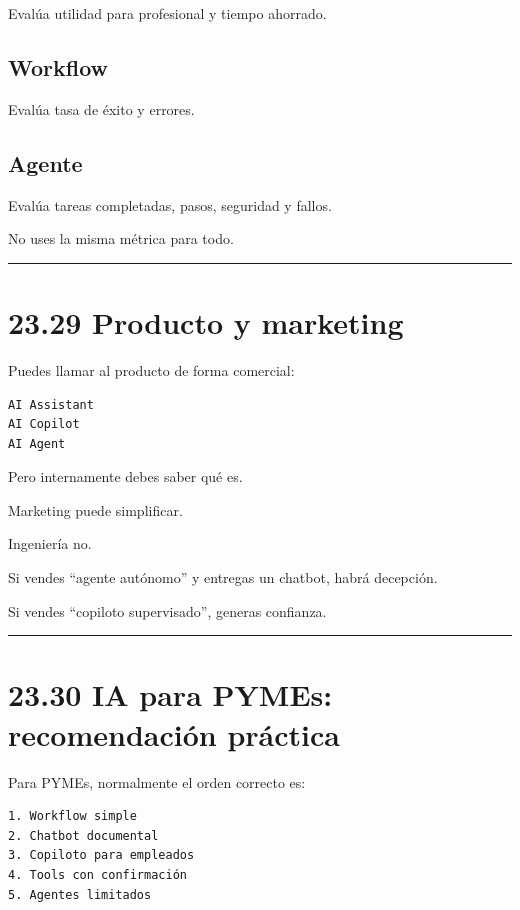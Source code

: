 Evalúa utilidad para profesional y tiempo ahorrado.

\subsection{Workflow}\label{workflow-4}

Evalúa tasa de éxito y errores.

\subsection{Agente}\label{agente-5}

Evalúa tareas completadas, pasos, seguridad y fallos.

No uses la misma métrica para todo.

\begin{center}\rule{0.5\linewidth}{0.5pt}\end{center}

\section{23.29 Producto y marketing}\label{producto-y-marketing}

Puedes llamar al producto de forma comercial:

\begin{lstlisting}
AI Assistant
AI Copilot
AI Agent
\end{lstlisting}

Pero internamente debes saber qué es.

Marketing puede simplificar.

Ingeniería no.

Si vendes ``agente autónomo'' y entregas un chatbot, habrá decepción.

Si vendes ``copiloto supervisado'', generas confianza.

\begin{center}\rule{0.5\linewidth}{0.5pt}\end{center}

\section{23.30 IA para PYMEs: recomendación
práctica}\label{ia-para-pymes-recomendaciuxf3n-pruxe1ctica}

Para PYMEs, normalmente el orden correcto es:

\begin{lstlisting}
1. Workflow simple
2. Chatbot documental
3. Copiloto para empleados
4. Tools con confirmación
5. Agentes limitados
\end{lstlisting}

